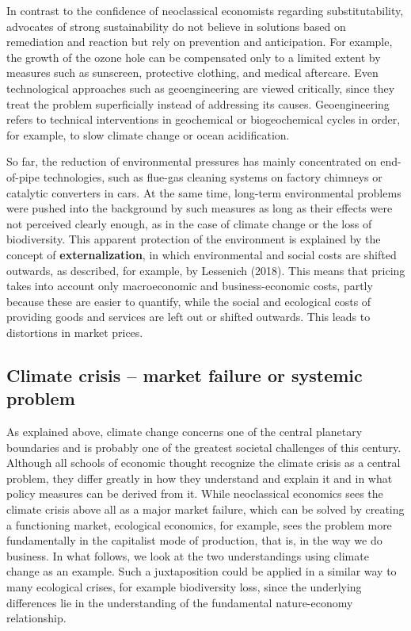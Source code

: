 \documentclass[
  british,
  a4paper,
  DIV=11,
  numbers=noendperiod,
  oneside,
  openany]{scrreprt}
\begin{document}
In contrast to the confidence of neoclassical economists regarding
substitutability, advocates of strong sustainability do not believe in
solutions based on remediation and reaction but rely on prevention and
anticipation. For example, the growth of the ozone hole can be
compensated only to a limited extent by measures such as sunscreen,
protective clothing, and medical aftercare. Even technological
approaches such as geoengineering are viewed critically, since they
treat the problem superficially instead of addressing its causes.
Geoengineering refers to technical interventions in geochemical or
biogeochemical cycles in order, for example, to slow climate change or
ocean acidification.

So far, the reduction of environmental pressures has mainly concentrated
on end-of-pipe technologies, such as flue-gas cleaning systems on
factory chimneys or catalytic converters in cars. At the same time,
long-term environmental problems were pushed into the background by such
measures as long as their effects were not perceived clearly enough, as
in the case of climate change or the loss of biodiversity. This apparent
protection of the environment is explained by the concept of
\textbf{externalization}, in which environmental and social costs are
shifted outwards, as described, for example, by Lessenich (2018). This
means that pricing takes into account only macroeconomic and
business-economic costs, partly because these are easier to quantify,
while the social and ecological costs of providing goods and services
are left out or shifted outwards. This leads to distortions in market
prices.

\subsection{Climate crisis -- market failure or systemic
problem}\label{climate-crisis-market-failure-or-systemic-problem}

As explained above, climate change concerns one of the central planetary
boundaries and is probably one of the greatest societal challenges of
this century. Although all schools of economic thought recognize the
climate crisis as a central problem, they differ greatly in how they
understand and explain it and in what policy measures can be derived
from it. While neoclassical economics sees the climate crisis above all
as a major market failure, which can be solved by creating a functioning
market, ecological economics, for example, sees the problem more
fundamentally in the capitalist mode of production, that is, in the way
we do business. In what follows, we look at the two understandings using
climate change as an example. Such a juxtaposition could be applied in a
similar way to many ecological crises, for example biodiversity loss,
since the underlying differences lie in the understanding of the
fundamental nature-economy relationship.
\end{document}
